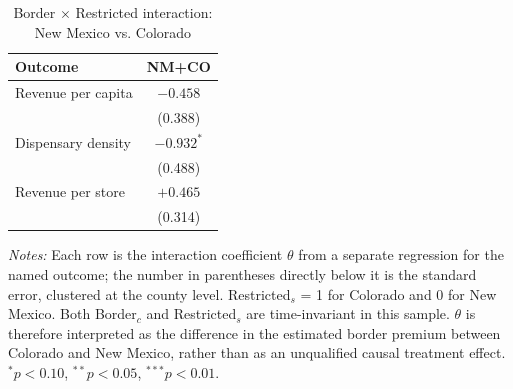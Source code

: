 \begin{table}[htbp]
\centering
\caption{Border $\times$ Restricted interaction: New Mexico vs. Colorado}
\label{tab:regime_interaction}
\footnotesize
\begin{tabular}{lc}
\toprule
Outcome & NM+CO \\
\midrule
Revenue per capita & $-0.458$ \\
 & (0.388) \\
Dispensary density & $-0.932^{*}$ \\
 & (0.488) \\
Revenue per store & $+0.465$ \\
 & (0.314) \\
\bottomrule
\end{tabular}
\begin{minipage}{0.98\textwidth}
\vspace{0.5em}

\fontsize{9pt}{11pt}\selectfont
\textit{Notes:} Each row is the interaction coefficient
$\theta$ from a separate regression for the named outcome; the number in
parentheses directly below it is the standard error, clustered at the county
level. Restricted$_s$ = 1 for Colorado and 0 for New Mexico. Both Border$_c$ and Restricted$_s$ are
time-invariant in this sample. $\theta$ is therefore interpreted as the
difference in the estimated border premium between Colorado and New Mexico,
rather than as an unqualified causal treatment effect.
$^{*}p<0.10$, $^{**}p<0.05$, $^{***}p<0.01$.
\end{minipage}
\end{table}
